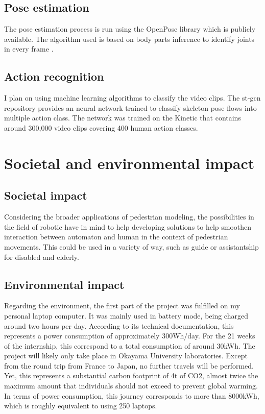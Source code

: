 \documentclass[12pt,a4paper,twoside]{article}
\begin{document}
\subsection{Pose estimation}
The pose estimation process is run using the OpenPose library which is publicly available. The algorithm used is based on body parts inference to identify joints in every frame \cite{Cao2016}.

\subsection{Action recognition}
I plan on using machine learning algorithms to classify the video clips. The st-gcn repository provides an neural network trained to classify skeleton pose flows into multiple action class. The network was trained on the Kinetic 
 that contains around 300,000 video clips covering 400 human action classes.

\section{Societal and environmental impact}

\subsection{Societal impact}
Considering the broader applications of pedestrian modeling, the possibilities in the field of robotic have in mind to help developing solutions to help smoothen interaction between automaton and human in the context of pedestrian movements. This could be used in a variety of way, such as guide or assistantship for disabled and elderly. 

\subsection{Environmental impact}
Regarding the environment, the first part of the project was fulfilled on my personal laptop computer. It was mainly used in battery mode, being charged around two hours per day. According to its technical documentation, this represents a power consumption of approximately 300Wh/day. For the 21 weeks of the internship, this correspond to a total consumption of around 30kWh.
The project will likely only take place in Okayama University laboratories. Except from the round trip from France to Japan, no further travels will be performed. Yet, this represents a substantial carbon footprint of 4t of CO2, almost twice the maximum amount that individuals should not exceed to prevent global warming. In terms of power consumption, this journey corresponds to more than 8000kWh, which is roughly equivalent to using 250 laptops. 

{}

\end{document}
